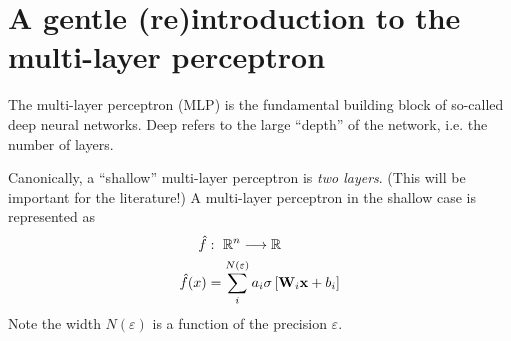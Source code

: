 \section{A gentle (re)introduction to the multi-layer perceptron}

\begin{frame}

    The multi-layer perceptron (MLP) is the fundamental building block of
    so-called deep neural networks. Deep refers to the large ``depth'' of the network, i.e. 
    the number of layers.

\end{frame}

\begin{frame}
    Canonically, a ``shallow'' multi-layer perceptron is \textit{two layers}. (This will be important
    for the literature!)
    A multi-layer perceptron in the shallow case is represented as
    \begin{align*}
        \hat{f} &: ~ \mathbb{R}^n \longrightarrow \mathbb{R} \\
        \hat{f}(x) &=  \sum_i^{N(\varepsilon)} a_i \sigma \left[\mathbf{W}_i \mathbf{x} + b_i \right]
    \end{align*}
    Note the width $N(\varepsilon)$ is a function of the precision $\varepsilon$.
\end{frame}

